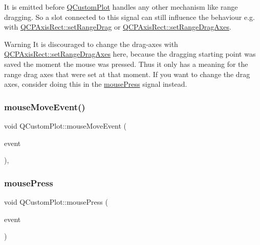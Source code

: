 It is emitted before \mbox{\hyperlink{class_q_custom_plot}{Q\+Custom\+Plot}} handles any other mechanism like range dragging. So a slot connected to this signal can still influence the behaviour e.\+g. with \mbox{\hyperlink{class_q_c_p_axis_rect_ae6aef2f7211ba6097c925dcd26008418}{Q\+C\+P\+Axis\+Rect\+::set\+Range\+Drag}} or \mbox{\hyperlink{class_q_c_p_axis_rect_a648cce336bd99daac4a5ca3e5743775d}{Q\+C\+P\+Axis\+Rect\+::set\+Range\+Drag\+Axes}}.

\begin{DoxyWarning}{Warning}
It is discouraged to change the drag-\/axes with \mbox{\hyperlink{class_q_c_p_axis_rect_a648cce336bd99daac4a5ca3e5743775d}{Q\+C\+P\+Axis\+Rect\+::set\+Range\+Drag\+Axes}} here, because the dragging starting point was saved the moment the mouse was pressed. Thus it only has a meaning for the range drag axes that were set at that moment. If you want to change the drag axes, consider doing this in the \mbox{\hyperlink{class_q_custom_plot_aca75bf9afb5dd19349c375de2a87a051}{mouse\+Press}} signal instead. 
\end{DoxyWarning}
\mbox{\label{class_q_custom_plot_ae7abdc93b26d2ad4632c1ab75ae5b46f}} 
\subsubsection{\texorpdfstring{mouseMoveEvent()}{mouseMoveEvent()}}
{\footnotesize\ttfamily void Q\+Custom\+Plot\+::mouse\+Move\+Event (\begin{DoxyParamCaption}\item[{Q\+Mouse\+Event $\ast$}]{event }\end{DoxyParamCaption})\hspace{0.3cm}{\ttfamily [protected]}, {\ttfamily [virtual]}}

\mbox{\label{class_q_custom_plot_aca75bf9afb5dd19349c375de2a87a051}} 
\subsubsection{\texorpdfstring{mousePress}{mousePress}}
{\footnotesize\ttfamily void Q\+Custom\+Plot\+::mouse\+Press (\begin{DoxyParamCaption}\item[{Q\+Mouse\+Event $\ast$}]{event }\end{DoxyParamCaption})\hspace{0.3cm}{\ttfamily [signal]}}

